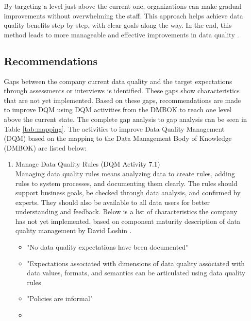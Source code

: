 \documentclass[conference]{IEEEtran}
\begin{document}
By targeting a level just above the current one, organizations can make gradual improvements without overwhelming the staff. This approach helps achieve data quality benefits step by step, with clear goals along the way. In the end, this method leads to more manageable and effective improvements in data quality \cite{loshin_dqi}.

\subsection{Recommendations}
Gaps between the company current data quality and the target expectations through assessments or interviews is identified. These gaps show characteristics that are not yet implemented. Based on these gaps, recommendations are made to improve DQM using DQM activities from the DMBOK to reach one level above the current state. The complete gap analysis to gap analysis can be seen in Table \ref{tab:mapping}.
The activities to improve Data Quality Management (DQM) based on the mapping to the Data Management Body of Knowledge (DMBOK) are listed below:
\begin{enumerate}
    \item Manage Data Quality Rules (DQM Activity 7.1) \\ Managing data quality rules means analyzing data to create rules, adding rules to system processes, and documenting them clearly. The rules should support business goals, be checked through data analysis, and confirmed by experts. They should also be available to all data users for better understanding and feedback. Below is a list of characteristics the company has not yet implemented, based on component maturity description of data quality management by David Loshin \cite{loshin_dqi}.
        \begin{itemize}
            \item "No data quality expectations have been documented"
            \item "Expectations associated with dimensions of data quality associated with data values, formats, and semantics can be articulated using data quality rules
            \item "Policies are informal"
            \item 
        \end{itemize}
\end{enumerate}
\end{document}
